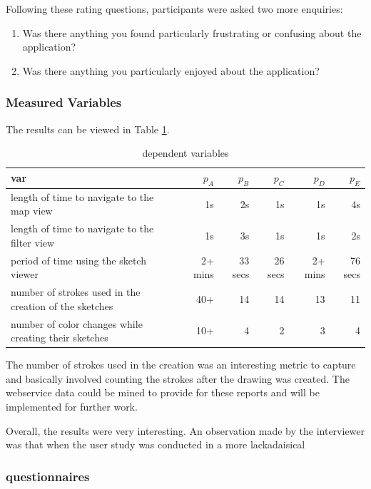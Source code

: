 \documentclass{chi2009}
\begin{document}
Following these rating questions, participants were asked two more enquiries:

\begin{enumerate}
\item Was there anything you found particularly frustrating or confusing about the application?
\item Was there anything you particularly enjoyed about the application?
\end{enumerate}

\subsubsection{Measured Variables}

The results can be viewed in Table \ref{tbl:deps}.

\begin{table}
\centering
\caption{dependent variables}
\begin{tabular}{|l|r|r|r|r|r|}
\hline
var & $p_A$ & $p_B$ & $p_C$ & $p_D$ & $p_E$   \\
\hline
length of time to navigate to the map view   &   1s  &  2s & 1s & 1s & 4s \\
length of time to navigate to the filter view &  1s  &  3s & 1s & 1s & 2s \\
period of time using the sketch viewer  &  2+ mins & 33 secs & 26 secs & 2+ mins & 76 secs  \\
number of strokes used in the creation of the sketches  &  40+ & 14 & 14 & 13 & 11 \\
number of color changes while creating their sketches  &  10+ & 4 & 2 & 3 & 4 \\
\hline
\end{tabular}
\label{tbl:deps}
\end{table}

The number of strokes used in the creation was an interesting metric to capture
and basically involved counting the strokes after the drawing was created.  The
webservice data could be mined to provide for these reports and will be
implemented for further work.

Overall, the results were very interesting.  An observation made by the
interviewer was that when the user study was conducted in a more lackadaisical

\subsubsection{questionnaires}
\end{document}
